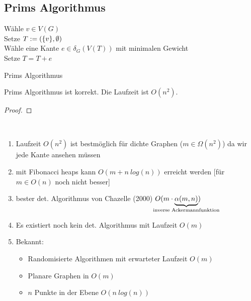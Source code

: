 \subsection*{Prims Algorithmus}
\begin{algorithm}
	\vspace*{5pt}
	Wähle $v\in V(G)$\\
	Setze $T:=(\{v\}, \emptyset)$\\
	{
		Wähle eine Kante $e\in \delta_G(V(T))$ mit minimalen Gewicht\\
		Setze $T=T+e$
	}
	\caption{Prims Algorithmus}
	\label{fig:Algorithmus}
\end{algorithm}
\begin{satz}
	Prims Algorithmus ist korrekt. Die Laufzeit ist $O(n^2)$.
\end{satz}
\begin{proof}
	
\end{proof}

\begin{rem}~
	\begin{enumerate}
		\item Laufzeit $O(n^2)$ ist bestmöglich für dichte Graphen ($m\in \Omega(n^2)$) da wir jede Kante ansehen müssen
		\item mit Fibonacci heaps kann $O(m+n~log(n))$ erreicht werden [für $m\in O(n)$ noch nicht besser]
		\item bester det. Algorithmus von Chazelle (2000) $O(m\cdot \underbrace{\alpha(m,n)}_{\mathclap{\text{inverse Ackermannfunktion}}})$
		\item Es existiert noch kein det. Algorithmus mit Laufzeit $O(m)$
		\item Bekannt:
		\begin{itemize}
			\item Randomisierte Algorithmen mit erwarteter Laufzeit $O(m)$
			\item Planare Graphen in $O(m)$
			\item $n$ Punkte in der Ebene $O(n~log(n))$
		\end{itemize}
	\end{enumerate}
\end{rem}
	